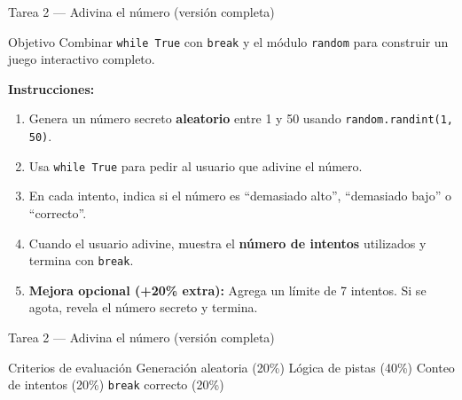 \documentclass[aspectratio=169,xcolor=dvipsnames]{beamer}
\begin{document}
\begin{frame}{Tarea 2 --- Adivina el n\'umero (versi\'on completa)}
    \begin{block}{Objetivo}
        Combinar \texttt{while True} con \texttt{break} y el m\'odulo \texttt{random}
        para construir un juego interactivo completo.
    \end{block}

    \vspace{0.2cm}
    \textbf{Instrucciones:}
    \footnotesize
    \begin{enumerate}
        \item Genera un n\'umero secreto \textbf{aleatorio} entre 1 y 50 usando \texttt{random.randint(1, 50)}.
        \item Usa \texttt{while True} para pedir al usuario que adivine el n\'umero.
        \item En cada intento, indica si el n\'umero es ``demasiado alto'', ``demasiado bajo'' o ``correcto''.
        \item Cuando el usuario adivine, muestra el \textbf{n\'umero de intentos} utilizados y termina con \texttt{break}.
        \item \textbf{Mejora opcional (+20\% extra):} Agrega un l\'imite de 7 intentos.
              Si se agota, revela el n\'umero secreto y termina.
    \end{enumerate}
\end{frame}

\begin{frame}{Tarea 2 --- Adivina el n\'umero (versi\'on completa)}
    \begin{alertblock}{Criterios de evaluaci\'on}
        Generaci\'on aleatoria (20\%) \quad L\'ogica de pistas (40\%) \quad
        Conteo de intentos (20\%) \quad \texttt{break} correcto (20\%)
    \end{alertblock}
\end{frame}

\end{document}
